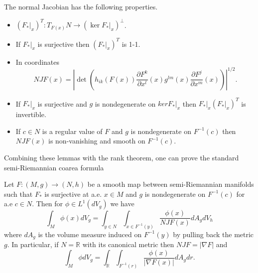 \begin{lemma}
The normal Jacobian has the following properties.
\begin{itemize}
\item $(F_*|_x)^T:T_{F(x)}N\rightarrow (\ker F_*|_x)^\perp$.
\item If $F_*|_x$ is surjective then $(F_*|_x)^T$ is 1-1.
\item In coordinates
\begin{equation}
NJF(x)=\left|\det\left(h_{ik}(F(x))\frac{\partial F^k}{\partial x^l}(x)g^{lm}(x)\frac{\partial F^j}{\partial x^m}(x)\right)\right|^{1/2}.
\end{equation}
\item  If $F_*|_x$ is surjective and $g$ is nondegenerate on $ker F_*|_x$ then $F_*|_x(F_*|_x)^T$ is invertible.
\item If $c\in N$ is a regular value of $F$ and $g$ is nondegenerate on $F^{-1}(c)$ then $NJF(x)$ is non-vanishing and smooth on $F^{-1}(c)$.
\end{itemize}
\end{lemma}

Combining these lemmas with the rank theorem, one can prove the standard semi-Riemannian coarea formula
\begin{theorem}
Let $F:(M,g)\rightarrow (N,h)$ be a smooth map between semi-Riemannian manifolds such that $F_*$ is surjective at a.e. $x\in M$ and $g$ is nondegenerate on $F^{-1}(c)$ for a.e $c\in N$.  Then for $\phi\in L^1(dV_g)$ we have
\begin{equation}
\int_M\phi(x)dV_g=\int_{y\in N}\int_{x\in F^{-1}(y)}\frac{\phi(x)}{NJF(x)}dA_g dV_h
\end{equation}
where $dA_g$ is the volume measure induced on $F^{-1}(y)$ by pulling back the metric $g$.  In particular, if $N=\mathbb{R}$ with its canonical metric then $NJF=|\nabla F|$ and 
\begin{equation}
\int_M \phi dV_g=\int_\mathbb{R}\int_{F^{-1}(r)}\frac{\phi(x)}{|\nabla F(x)|} dA_g dr.
\end{equation}
\end{theorem}

